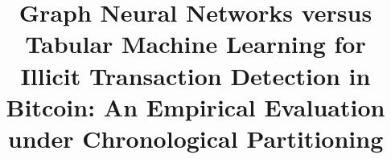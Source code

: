 \documentclass[conference]{IEEEtran}
\begin{document}
\title{Graph Neural Networks versus Tabular Machine Learning for Illicit Transaction Detection in Bitcoin: An Empirical Evaluation under Chronological Partitioning}

\author{
}

\maketitle

\begin{abstract}

\end{abstract}
\end{document}
